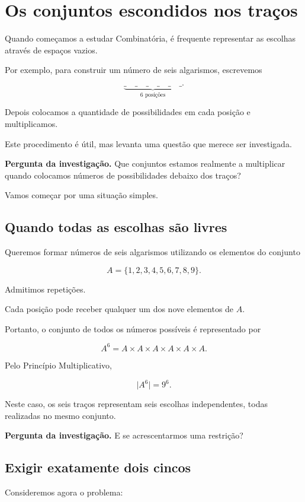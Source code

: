 \documentclass[11pt,a4paper,oneside]{book}
\newcommand{\Pergunta}[1]{\begin{perguntabox}\textbf{Pergunta da investigação.} #1\end{perguntabox}}
\newcommand{\card}[1]{\lvert #1\rvert}
\begin{document}
\section{Os conjuntos escondidos nos traços}

Quando começamos a estudar Combinatória,
é frequente representar as escolhas
através de espaços vazios.

Por exemplo, para construir um número
de seis algarismos, escrevemos

\[
\underbrace{\_\quad\_\quad\_\quad
\_\quad\_\quad\_}_{6\text{ posições}}.
\]

Depois colocamos a quantidade de possibilidades
em cada posição e multiplicamos.

Este procedimento é útil, mas levanta
uma questão que merece ser investigada.

\Pergunta{Que conjuntos estamos realmente
a multiplicar quando colocamos números
de possibilidades debaixo dos traços?}

Vamos começar por uma situação simples.

\subsection*{Quando todas as escolhas são livres}

Queremos formar números de seis algarismos
utilizando os elementos do conjunto

\[
A=\{1,2,3,4,5,6,7,8,9\}.
\]

Admitimos repetições.

Cada posição pode receber qualquer
um dos nove elementos de $A$.

Portanto, o conjunto de todos
os números possíveis é representado por

\[
A^6=A\times A\times A\times A\times A\times A.
\]

Pelo Princípio Multiplicativo,

\[
\card{A^6}=9^6.
\]

Neste caso, os seis traços representam
seis escolhas independentes,
todas realizadas no mesmo conjunto.

\Pergunta{E se acrescentarmos uma restrição?}

\subsection*{Exigir exatamente dois cincos}

Consideremos agora o problema:
\end{document}
